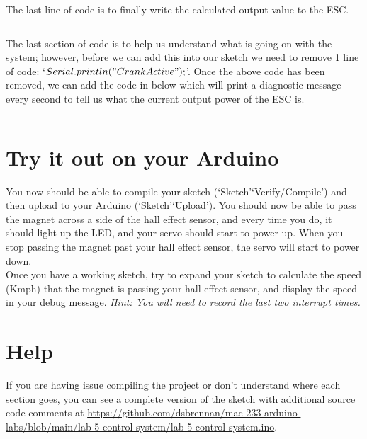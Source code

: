 \documentclass[11pt,a4paper]{article}
\begin{document}
\noindent
The last line of code is to finally write the calculated output value to the ESC.\\
\vspace{-1.75em}
\inputminted{arduino}{./src/5-esc-power.txt}
\vspace{.75em}

\noindent
The last section of code is to help us understand what is going on with the system; however, before we can add this into our sketch we need to remove 1 line of code: `$Serial.println("Crank Active");$'. Once the above code has been removed, we can add the code in below which will print a diagnostic message every second to tell us what the current output power of the ESC is.\\
\vspace{-1.75em}
\inputminted{arduino}{./src/6-message.txt}
\vspace{-1em}

\section*{Try it out on your Arduino}
You now should be able to compile your sketch (`Sketch'\textrightarrow `Verify/Compile') and then upload to your Arduino (`Sketch'\textrightarrow `Upload'). You should now be able to pass the magnet across a side of the hall effect sensor, and every time you do, it should light up the LED, and your servo should start to power up. When you stop passing the magnet past your hall effect sensor, the servo will start to power down.\\

\noindent
Once you have a working sketch, try to expand your sketch to calculate the speed (Kmph) that the magnet is passing your hall effect sensor, and display the speed in your debug message. \textit{Hint: You will need to record the last two interrupt times.}

\section*{Help}
If you are having issue compiling the project or don't understand where each section goes, you can see a complete version of the sketch with additional source code comments at \url{https://github.com/dsbrennan/mac-233-arduino-labs/blob/main/lab-5-control-system/lab-5-control-system.ino}.

\begin{center}
\end{center}
\end{document}
